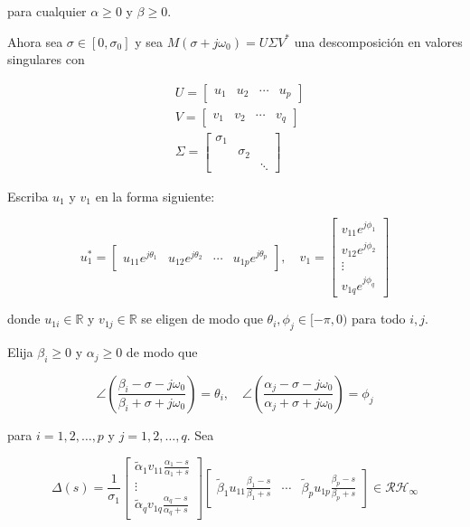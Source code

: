para cualquier $\alpha \geq 0$ y $\beta \geq 0$.

Ahora sea $\sigma \in\left[0, \sigma_{0}\right]$ y sea $M\left(\sigma+j \omega_{0}\right)=U \Sigma V^{*}$ una descomposición en valores singulares con

$$
\begin{aligned}
& U=\left[\begin{array}{llll}
u_{1} & u_{2} & \cdots & u_{p}
\end{array}\right] \\
& V=\left[\begin{array}{llll}
v_{1} & v_{2} & \cdots & v_{q}
\end{array}\right] \\
& \Sigma=\left[\begin{array}{lll}
\sigma_{1} & & \\
& \sigma_{2} & \\
& & \ddots
\end{array}\right]
\end{aligned}
$$

Escriba $u_{1}$ y $v_{1}$ en la forma siguiente:

$$
u_{1}^{*}=\left[\begin{array}{llll}
u_{11} e^{j \theta_{1}} & u_{12} e^{j \theta_{2}} & \cdots & u_{1 p} e^{j \theta_{p}}
\end{array}\right], \quad v_{1}=\left[\begin{array}{c}
v_{11} e^{j \phi_{1}} \\
v_{12} e^{j \phi_{2}} \\
\vdots \\
v_{1 q} e^{j \phi_{q}}
\end{array}\right]
$$

donde $u_{1 i} \in \mathbb{R}$ y $v_{1 j} \in \mathbb{R}$ se eligen de modo que $\theta_{i}, \phi_{j} \in[-\pi, 0)$ para todo $i, j$.

Elija $\beta_{i} \geq 0$ y $\alpha_{j} \geq 0$ de modo que

$$
\angle\left(\frac{\beta_{i}-\sigma-j \omega_{0}}{\beta_{i}+\sigma+j \omega_{0}}\right)=\theta_{i}, \quad \angle\left(\frac{\alpha_{j}-\sigma-j \omega_{0}}{\alpha_{j}+\sigma+j \omega_{0}}\right)=\phi_{j}
$$

para $i=1,2, \ldots, p$ y $j=1,2, \ldots, q$. Sea

$$
\Delta(s)=\frac{1}{\sigma_{1}}\left[\begin{array}{c}
\tilde{\alpha}_{1} v_{11} \frac{\alpha_{1}-s}{\alpha_{1}+s} \\
\vdots \\
\tilde{\alpha}_{q} v_{1 q} \frac{\alpha_{q}-s}{\alpha_{q}+s}
\end{array}\right]\left[\begin{array}{lll}
\tilde{\beta}_{1} u_{11} \frac{\beta_{1}-s}{\beta_{1}+s} & \cdots & \tilde{\beta}_{p} u_{1 p} \frac{\beta_{p}-s}{\beta_{p}+s}
\end{array}\right] \in \mathcal{R} \mathcal{H}_{\infty}
$$

